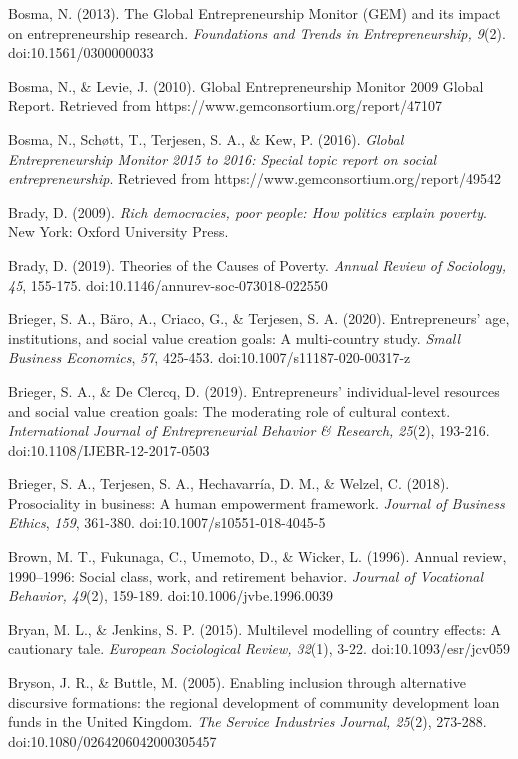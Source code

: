 \documentclass{article}
\begin{document}
Bosma, N. (2013). The Global Entrepreneurship Monitor (GEM) and its impact on entrepreneurship research. \emph{Foundations and Trends in Entrepreneurship, 9}(2). doi:10.1561/0300000033

Bosma, N., \& Levie, J. (2010). Global Entrepreneurship Monitor 2009 Global Report. Retrieved from https://www.gemconsortium.org/report/47107

Bosma, N., Schøtt, T., Terjesen, S. A., \& Kew, P. (2016). \emph{Global Entrepreneurship Monitor 2015 to 2016: Special topic report on social entrepreneurship}. Retrieved from https://www.gemconsortium.org/report/49542

Brady, D. (2009). \emph{Rich democracies, poor people: How politics explain poverty}. New York: Oxford University Press.

Brady, D. (2019). Theories of the Causes of Poverty. \emph{Annual Review of Sociology, 45}, 155-175. doi:10.1146/annurev-soc-073018-022550

Brieger, S. A., Bäro, A., Criaco, G., \& Terjesen, S. A. (2020). Entrepreneurs' age, institutions, and social value creation goals: A multi-country study. \emph{Small Business Economics}, \emph{57}, 425-453. doi:10.1007/s11187-020-00317-z

Brieger, S. A., \& De Clercq, D. (2019). Entrepreneurs' individual-level resources and social value creation goals: The moderating role of cultural context. \emph{International Journal of Entrepreneurial }\emph{Behavior}\emph{ \& Research, 25}(2), 193-216. doi:10.1108/IJEBR-12-2017-0503

Brieger, S. A., Terjesen, S. A., Hechavarría, D. M., \& Welzel, C. (2018). Prosociality in business: A human empowerment framework. \emph{Journal of Business Ethics}, \emph{159}, 361-380. doi:10.1007/s10551-018-4045-5

Brown, M. T., Fukunaga, C., Umemoto, D., \& Wicker, L. (1996). Annual review, 1990--1996: Social class, work, and retirement behavior. \emph{Journal of Vocational }\emph{Behavior}\emph{, 49}(2), 159-189. doi:10.1006/jvbe.1996.0039

Bryan, M. L., \& Jenkins, S. P. (2015). Multilevel modelling of country effects: A cautionary tale. \emph{European Sociological Review, 32}(1), 3-22. doi:10.1093/esr/jcv059

Bryson, J. R., \& Buttle, M. (2005). Enabling inclusion through alternative discursive formations: the regional development of community development loan funds in the United Kingdom. \emph{The Service Industries Journal, 25}(2), 273-288. doi:10.1080/0264206042000305457
\end{document}

